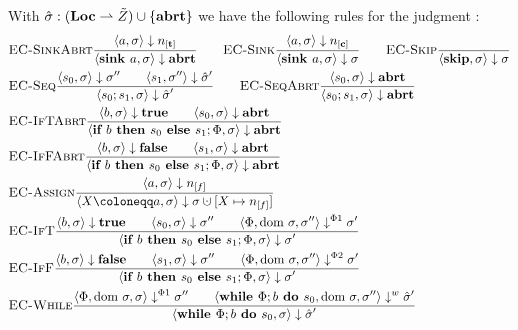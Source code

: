 With $\hat{\sigma}{}: (\textbf{Loc} \rightharpoonup \tilde{Z}) \cup \{\textbf{abrt}\}$ we have the following rules for the
 judgment :
\begin{align*}
    &\bsrule{EC-SinkAbrt}{\bigstep{a}{\store}{\tracked{}}}
    {\bigstep{\defaultsink}{\store}{\exception}} \qquad
    \bsrule{EC-Sink}{\bigstep{a}{\store}{\clean{}}}
    {\bigstep{\defaultsink}{\store}{\store}} \qquad
    \bsrule{EC-Skip}{}{\bigstep{\skipcmd}{\store}{\store}}\\
    &\bsrule{EC-Seq}{\bigstep{s_0}{\sigma}{\store''} \qquad \bigstep{s_1}{\store''}{\excstore'}}
    {\bigstep{\defaultssaseq}{\store}{\excstore'}}\qquad
    \bsrule{EC-SeqAbrt}{\bigstep{s_0}{\sigma}{\exception}}
    {\bigstep{\defaultssaseq}{\store}{\exception}} \\
    &\bsrule{EC-IfTAbrt}{\bigstep{b}{\store}{\btrue}\qquad \bigstep{s_0}{\store}{\exception}}
    {\bigstep{\defaultssaif}{\store}{\exception}}\\
    &\bsrule{EC-IfFAbrt}{\bigstep{b}{\store}{\bfalse}\qquad \bigstep{s_1}{\store}{\exception}}
    {\bigstep{\defaultssaif}{\store}{\exception}}\\
    &\bsrule{EC-Assign}{\bigstep{a}{\store}{\flagged{}}}
    {\bigstep{\defaultstore}{\store}{\storeassign{\store}{X \mapsto \flagged{}}}}\\
    &\bsrule{EC-IfT}{\bigstep{b}{\store}{\btrue}\qquad \bigstep{s_0}{\store}{\store''}
    \qquad \bigsteppl{\philist}{\dom\store}{\store''}{\store'}}
    {\bigstep{\defaultssaif}{\store}{\store'}}\\
    &\bsrule{EC-IfF}{\bigstep{b}{\store}{\bfalse}\qquad \bigstep{s_1}{\store}{\store''}
    \qquad \bigsteppr{\philist}{\dom\store}{\store''}{\store'}}
    {\bigstep{\defaultssaif}{\store}{\store'}}\\
    &\bsrule{EC-While}{\bigsteppl{\philist}{\dom\store}{\store}{\store''} \qquad
    \bigstepw{\defaultssawhile}{\dom\store}{\store''}{\excstore'}}
    {\bigstep{\defaultssawhile}{\store}{\excstore'}}\\
\end{align*}

